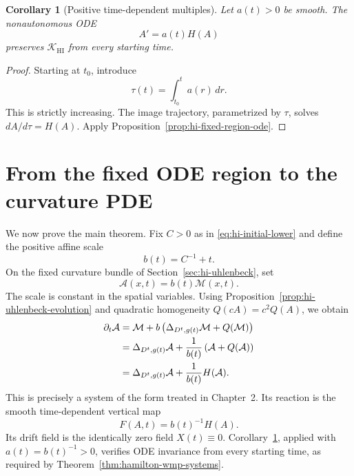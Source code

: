 \documentclass[10pt]{coll-l}
\newtheorem{corollary}[theorem]{Corollary}
\theoremstyle{definition}
\theoremstyle{remark}
\numberwithin{section}{chapter}
\numberwithin{equation}{chapter}
\begin{document}
\begin{corollary}[Positive time-dependent multiples]
\label{cor:hi-time-multiple-ode}
Let $a(t)>0$ be smooth.  The nonautonomous ODE
\[
                         A'=a(t)H(A)
\]
preserves $\mathcal K_{\mathrm{HI}}$ from every starting time.
\end{corollary}

\begin{proof}
Starting at $t_0$, introduce
\[
                    \tau(t)=\int_{t_0}^t a(r)\,dr.
\]
This is strictly increasing.  The image trajectory, parametrized by
$\tau$, solves $dA/d\tau=H(A)$.  Apply
Proposition~\ref{prop:hi-fixed-region-ode}.
\end{proof}

\section{From the fixed ODE region to the curvature PDE}
\label{sec:hi-pde}

We now prove the main theorem.  Fix $C>0$ as in
\eqref{eq:hi-initial-lower} and define the positive affine scale
\begin{equation}
                  b(t)=C^{-1}+t.                          \label{eq:hi-b}
\end{equation}
On the fixed curvature bundle of Section~\ref{sec:hi-uhlenbeck}, set
\begin{equation}
                  \mathcal A(x,t)=b(t)\mathcal M(x,t).    \label{eq:hi-rescaled-curvature}
\end{equation}
The scale is constant in the spatial variables.  Using
Proposition~\ref{prop:hi-uhlenbeck-evolution} and quadratic homogeneity
$Q(cA)=c^2Q(A)$, we obtain
\begin{align}
 \partial_t\mathcal A
 &=\mathcal M+b\left(\Delta_{D^t,g(t)}\mathcal M
                         +Q(\mathcal M)\right) \notag\\
 &=\Delta_{D^t,g(t)}\mathcal A
     +\frac1{b(t)}\left(\mathcal A+Q(\mathcal A)\right)   \notag\\
 &=\Delta_{D^t,g(t)}\mathcal A
     +\frac1{b(t)}H(\mathcal A).                          \label{eq:hi-rescaled-pde}
\end{align}
This is precisely a system of the form treated in Chapter~2.  Its reaction
is the smooth time-dependent vertical map
\[
                 F(A,t)=b(t)^{-1}H(A).
\]
Its drift field is the identically zero field $X(t)\equiv0$.
Corollary~\ref{cor:hi-time-multiple-ode}, applied with
$a(t)=b(t)^{-1}>0$, verifies ODE invariance from every starting time, as
required by Theorem~\ref{thm:hamilton-wmp-systems}.
\end{document}
